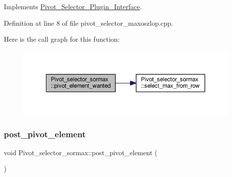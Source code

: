 Implements \hyperlink{classPivot__Selector__Plugin__Interface_a79edca6930746a137a95a26239f7af5e}{Pivot\+\_\+\+Selector\+\_\+\+Plugin\+\_\+\+Interface}.



Definition at line 8 of file pivot\+\_\+selector\+\_\+maxoszlop.\+cpp.

Here is the call graph for this function\+:\nopagebreak
\begin{figure}[H]
\begin{center}
\leavevmode
\includegraphics[width=350pt]{classPivot__selector__sormax_acfb3f057c0d2dd29b33ef23d547dfe36_cgraph}
\end{center}
\end{figure}
\mbox{\label{classPivot__selector__sormax_a1f19dc653e774ae625a96695469a411c}} 
\subsubsection{\texorpdfstring{post\+\_\+pivot\+\_\+element}{post\_pivot\_element}}
{\footnotesize\ttfamily void Pivot\+\_\+selector\+\_\+sormax\+::post\+\_\+pivot\+\_\+element (\begin{DoxyParamCaption}\item[{Q\+Model\+Index}]{ }\end{DoxyParamCaption})\hspace{0.3cm}{\ttfamily [signal]}}

